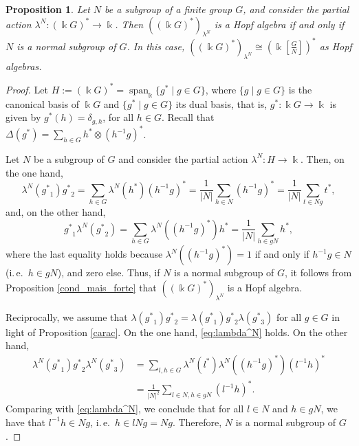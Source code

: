 \documentclass[reqno]{amsart}
\newtheorem{prop}[thm]{Proposition}
\theoremstyle{definition}
\DeclareMathOperator{\spn}{span}
\numberwithin{equation}{section}\theoremstyle{plain}
\theoremstyle{definition}
\def \k {\Bbbk}
\begin{document}
\begin{prop}
   Let $N$ be a subgroup of a finite group $G$, and consider the partial action $\lambda^N:(\Bbbk G)^{\ast} \to \Bbbk$. Then ${\left(\left(\Bbbk G\right)^{\ast}\right) }_{\lambda^N}$ is a Hopf algebra if and only if $N$ is a normal subgroup of $G$.
   In this case, ${\left(\left(\Bbbk G\right)^{\ast}\right) }_{\lambda^N} \cong \left(\Bbbk \left[\frac{G}{N}\right]\right)^*$ as Hopf algebras.
\end{prop}
\begin{proof}
Let $H:=\left(\Bbbk G\right)^{\ast}=\spn_{\k}\{g^* \mid g \in G\}$, where $\{g \mid g \in G\}$ is the canonical basis of $\k G$ and $\{g^* \mid g \in G\}$ its dual basis, that is, $g^\ast: \k G \to \k$ is given by $g^\ast (h)= \delta_{g,h}$, for all $h \in G$.
Recall that $\Delta(g^*)=\sum_{h\in G}h^*\otimes (h^{-1}g)^*$. 

Let $N$ be a subgroup of $G$ and consider the partial action $\lambda^N: H \to \k$. 
Then, on the one hand,
\begin{equation} 
\label{eq:lambda^N}
\lambda^N\left({g^\ast}_1\right) {g^\ast}_2 = \sum_{h \in G} \lambda^N\left(h^\ast\right)\left({h^{-1}g}\right)^\ast = \frac{1}{|N|} \sum_{h \in N} \left({h^{-1}g}\right)^\ast = \frac{1}{|N|} \sum_{t \in Ng} t^\ast, \end{equation}
and, on the other hand,
$${g^\ast}_1 \lambda^N\left({g^\ast }_2\right) = \sum_{h \in G} \lambda^N\left(\left({h^{-1}g}\right)^\ast\right) h^{\ast}  = \frac{1}{|N|} \sum_{h \in gN} h^\ast, $$
where the last equality holds because \(\lambda^N(({h^{-1}g})^\ast) = 1\) if and only if \(h^{-1}g \in N\) (i.\,e.\ \(h \in gN\)), and zero else. 
Thus, if $N$ is a normal subgroup of $G$, it follows from Proposition \ref{cond_mais_forte} that ${\left(\left(\Bbbk G\right)^{\ast}\right) }_{\lambda^N}$ is a Hopf algebra.

Reciprocally, we assume that $\lambda({g^\ast}_1) {g^\ast}_2 =\lambda({g^\ast}_1 ){g^\ast}_2 \lambda({g^\ast}_3)$ for all $g\in G$ in light of Proposition \ref{carac}. On the one hand, \eqref{eq:lambda^N} holds. 
On the other hand, 
\begin{align*}
 \lambda^N({g^\ast}_1) {g^\ast}_2 \lambda^N({g^\ast}_3) & = \sum_{l,h\in G}\lambda^N(l^*)\lambda^N((h^{-1}g)^*)(l^{-1}h)^*\\
 & =  \frac{1}{|N|^2} \sum_{l\in N,h\in gN} (l^{-1}h)^*.
\end{align*}
Comparing with \eqref{eq:lambda^N}, we conclude that for all $l\in N$ and $h\in gN$, we have that $l^{-1}h\in Ng$, i.\,e.\ \(h \in l N g = Ng\). Therefore, $N$ is a normal subgroup of $G$. 


\end{proof}
\end{document}
